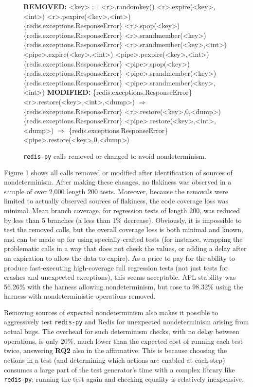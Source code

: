\begin{figure}
{\scriptsize
\begin{code}
{\bf REMOVED:}    
<key> := <r>.randomkey() 
<r>.expire(<key>,<int>)
<r>.pexpire(<key>,<int>)
\{redis.exceptions.ResponseError\} <r>.spop(<key>)
\{redis.exceptions.ResponseError\} <r>.srandmember(<key>)
\{redis.exceptions.ResponseError\} <r>.srandmember(<key>,<int>)
<pipe>.expire(<key>,<int>)
<pipe>.pexpire(<key>,<int>)
\{redis.exceptions.ResponseError\} <pipe>.spop(<key>)
\{redis.exceptions.ResponseError\} <pipe>.srandmember(<key>)
\{redis.exceptions.ResponseError\} <pipe>.srandmember(<key>,<int>)
\vspace{0.1in}
{\bf MODIFIED:}
\{redis.exceptions.ResponseError\} <r>.restore(<key>,<int>,<dump>)
{\bf $\Rightarrow$}
\{redis.exceptions.ResponseError\} <r>.restore(<key>,0,<dump>)
\vspace{0.07in}
\{redis.exceptions.ResponseError\} <pipe>.restore(<key>,<int>,<dump>)
{\bf $\Rightarrow$}
\{redis.exceptions.ResponseError\} <pipe>.restore(<key>,0,<dump>)
\end{code}
}
\caption{{\tt redis-py} calls removed or changed to avoid
  nondeterminism.}
\label{fig:flakysource}
\end{figure}

Figure \ref{fig:flakysource} shows all calls removed or modified after
identification of sources of nondeterminism.  After making these changes, no flakiness was observed in a sample of over 2,000 length
200 tests.   Moreover, because the removals were limited to actually
observed sources of flakiness, the code coverage loss was minimal.
Mean branch coverage, for regression tests of length 200, was reduced
by less than 5 branches (a less than 1\% decrease).  Obviously, it is
impossible to test the removed calls, but the overall coverage loss is
both minimal and known, and can be made up for using specially-crafted
tests (for instance, wrapping the problematic calls in a way that does
not check the values, or adding a delay after an expiration to allow
the data to expire).  As a price to pay for the ability to produce
fast-executing high-coverage full regression tests (not just tests for
crashes and unexpected exceptions), this seems acceptable.  AFL stability was 56.26\% with the harness allowing 
nondeterminism, but rose to 98.32\% using the harness with 
nondeterministic operations removed.

Removing sources of expected nondeterminism also makes
it possible to aggressively test {\tt redis-py} and Redis for
unexpected nondeterminism arising from actual bugs.  The overhead for such
determinism checks, with no delay between operations, is only
20\%, much lower than the expected cost of running each test twice,
answering {\bf RQ2} also in the affirmative.  This is because choosing the actions in a test (and determining which
actions are enabled at each step) consumes a large part of the test
generator's time with a complex library like {\tt redis-py}; running the test again and checking equality is
relatively inexpensive.   

